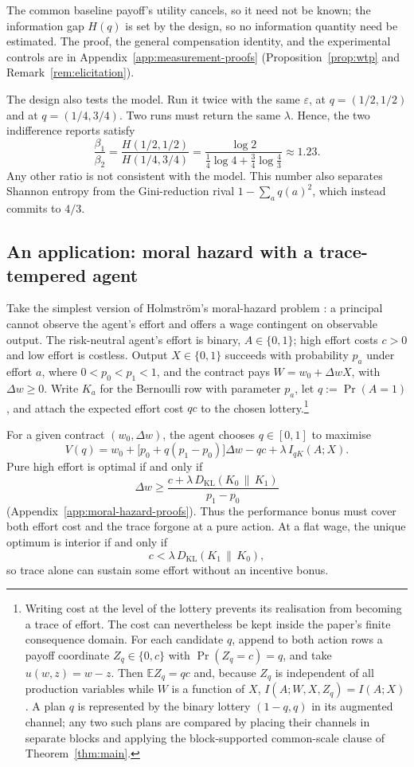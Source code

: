 \documentclass[11pt,a4paper]{article}
\theoremstyle{definition}
\newcommand{\E}{\mathbb E}
\newcommand{\I}{I}
\newcommand{\Sh}{H}
\newcommand{\KL}{D_{\mathrm{KL}}}
\newcommand{\1}{\mathbf 1}
\begin{document}
The common baseline payoff's utility cancels, so it need not be known; the information gap $\Sh(q)$ is set by
the design, so no information quantity need be estimated.  The proof, the general compensation identity, and
the experimental controls are in Appendix~\ref{app:measurement-proofs} (Proposition~\ref{prop:wtp} and
Remark~\ref{rem:elicitation}).

The design also tests the model.  Run it twice with the same $\varepsilon$, at $q=(1/2,1/2)$ and at
$q=(1/4,3/4)$.  Two runs must return the same $\lambda$. Hence, the two indifference
reports satisfy
\[
 \frac{\beta_1}{\beta_2}
 =\frac{\Sh(1/2,1/2)}{\Sh(1/4,3/4)}
 =\frac{\log 2}{\frac14\log4+\frac34\log\frac43}
 \approx1.23.
\]
 Any other ratio is not consistent with
the model.  This number also separates Shannon entropy from the Gini-reduction rival
$1-\sum_aq(a)^2$, which instead commits to $4/3$.


\subsection{An application: moral hazard with a trace-tempered agent}\label{sec:application}
Take the simplest version of Holmstr\"om's moral-hazard problem \cite{Holmstrom1979}: a principal cannot observe
the agent's effort and offers a wage contingent on observable output.  The risk-neutral agent's effort is binary,
$A\in\{0,1\}$; high effort costs $c>0$ and low effort is costless.  Output $X\in\{0,1\}$ succeeds with
probability $p_a$ under effort $a$, where $0<p_0<p_1<1$, and the contract pays $W=w_0+\Delta wX$, with
$\Delta w\ge0$.  Write
$K_a$ for the Bernoulli row with parameter $p_a$, let $q:=\Pr(A=1)$, and attach the expected effort cost
$qc$ to the chosen lottery.\footnote{Writing cost at the level of the lottery prevents its realisation
from becoming a trace of effort.  The cost can nevertheless be kept inside the paper's finite consequence
domain.  For each candidate $q$, append to both action rows a payoff coordinate
$Z_q\in\{0,c\}$ with $\Pr(Z_q=c)=q$, and take $u(w,z)=w-z$.  Then $\E Z_q=qc$ and, because $Z_q$ is
independent of all production variables while $W$ is a function of $X$,
$\I(A;W,X,Z_q)=\I(A;X)$.  A plan $q$ is represented by the binary lottery $(1-q,q)$ in its augmented channel; any two
such plans are compared by placing their channels in separate blocks and applying the block-supported
common-scale clause of Theorem~\ref{thm:main}.}

For a given contract $(w_0, \Delta w)$,  the agent chooses $q\in[0,1]$ to maximise
\[
 V(q)=w_0+\bigl[p_0+q(p_1-p_0)\bigr]\Delta w-qc
      +\lambda\,\I_{qK}(A;X).
\]
Pure high effort is optimal if and only if
\[
 \Delta w\ge \frac{c+\lambda\,\KL(K_0\,\|\,K_1)}{p_1-p_0}
\]
(Appendix~\ref{app:moral-hazard-proofs}). Thus the performance bonus must cover both effort cost and the trace forgone
at a pure action.  At a flat wage, the unique optimum is interior if and only if
\[
 c<\lambda\,\KL(K_1\,\|\,K_0),
\]
so trace alone can sustain some effort without an incentive bonus.
\end{document}
